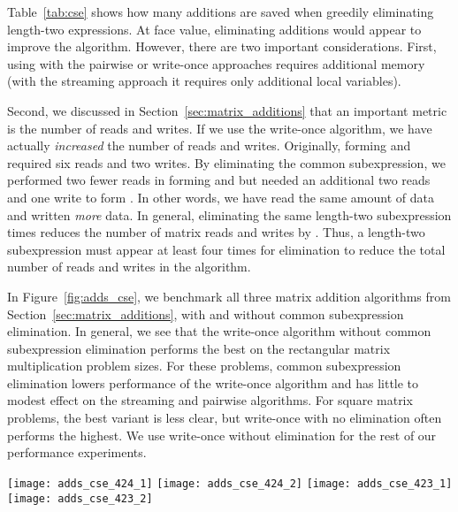 \documentclass[preprint]{sigplanconf}
\begin{document}
Table~\ref{tab:cse} shows how many additions are saved when greedily eliminating length-two expressions.
At face value, eliminating additions would appear to improve the algorithm.
However, there are two important considerations.
First, using  with the pairwise or write-once approaches requires additional memory (with the streaming approach it requires only additional local variables).

Second, we discussed in Section~\ref{sec:matrix_additions} that an important metric
is the number of reads and writes.
If we use the write-once algorithm, we have actually \emph{increased} the number of reads and writes.
Originally, forming  and  required six reads and two writes.
By eliminating the common subexpression, we performed two fewer reads in forming  and  but needed
an additional two reads and one write to form .
In other words, we have read the same amount of data and written \emph{more} data.
In general, eliminating the same length-two subexpression  times reduces the number of matrix reads and writes by .
Thus, a length-two subexpression must appear at least four times for elimination to reduce the total number of reads and writes in the algorithm.

In Figure~\ref{fig:adds_cse}, we benchmark all three matrix addition algorithms from Section~\ref{sec:matrix_additions}, with and without common subexpression elimination.
In general, we see that the write-once algorithm without common subexpression elimination performs the best on the rectangular matrix multiplication problem sizes.
For these problems, common subexpression elimination lowers performance of the write-once algorithm and has little to modest effect on the streaming and pairwise algorithms.
For square matrix problems, the best variant is less clear, but write-once with no elimination often performs the highest.
We use write-once without elimination for the rest of our performance experiments.


\begin{figure*}[tb]
\centering
\texttt{[image: adds\_cse\_424\_1]}
\texttt{[image: adds\_cse\_424\_2]}
\texttt{[image: adds\_cse\_423\_1]}
\texttt{[image: adds\_cse\_423\_2]}
\caption{
Effective performance (Equation~\eqref{eqn:eff_perf}) comparison of common subexpression elimination (CSE) and the three matrix addition methods: write-once, streaming, and pairwise (see Section~\ref{sec:matrix_additions}).
We use the code generator to implement six variants of fast algorithms for  and : using CSE or not for each of the three addition variants.
The  fast algorithm computed  (``outer product" shape) for varying ,
and the  fast algorithm computed  (square multiplication).
For the  fast algorithm, no CSE with write-once additions has the highest performance;
for the  fast algorithm, it is less clear.
The pairwise variants tend to be slower because they perform more reads and writes.
}
\label{fig:adds_cse}
\end{figure*}
\end{document}
